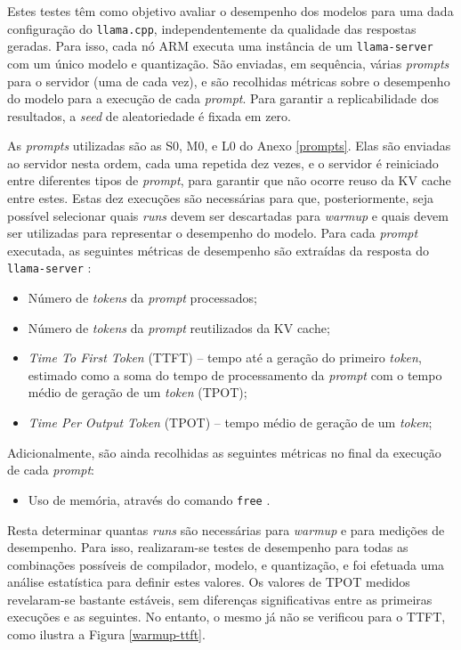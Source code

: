 \documentclass[11pt, a4paper]{article}
\begin{document}
Estes testes têm como objetivo avaliar o desempenho dos modelos para uma dada configuração do
\texttt{llama.cpp}, independentemente da qualidade das respostas geradas. Para isso, cada nó ARM
executa uma instância de um \texttt{llama-server} com um único modelo e quantização. São enviadas,
em sequência, várias \emph{prompts} para o servidor (uma de cada vez), e são recolhidas métricas
sobre o desempenho do modelo para a execução de cada \emph{prompt}. Para garantir a replicabilidade
dos resultados, a \emph{seed} de aleatoriedade é fixada em zero.

As \emph{prompts} utilizadas são as S0, M0, e L0 do Anexo \ref{prompts}. Elas são enviadas ao
servidor nesta ordem, cada uma repetida dez vezes, e o servidor é reiniciado entre diferentes tipos
de \emph{prompt}, para garantir que não ocorre reuso da KV cache entre estes. Estas dez execuções
são necessárias para que, posteriormente, seja possível selecionar quais \emph{runs} devem ser
descartadas para \emph{warmup} e quais devem ser utilizadas para representar o desempenho do modelo.
Para cada \emph{prompt} executada, as seguintes métricas de desempenho são extraídas da resposta do
\texttt{llama-server} \cite{completions-api}:

\begin{itemize}
    \item Número de \emph{tokens} da \emph{prompt} processados;
    \item Número de \emph{tokens} da \emph{prompt} reutilizados da KV cache;
    \item \emph{Time To First Token} (TTFT) -- tempo até a geração do primeiro \emph{token},
          estimado como a soma do tempo de processamento da \emph{prompt} com o tempo médio de
          geração de um \emph{token} (TPOT);
    \item \emph{Time Per Output Token} (TPOT) -- tempo médio de geração de um \emph{token};
\end{itemize}

Adicionalmente, são ainda recolhidas as seguintes métricas no final da execução de cada
\emph{prompt}:

\begin{itemize}
    \item Uso de memória, através do comando \texttt{free} \cite{free}.
\end{itemize}

Resta determinar quantas \emph{runs} são necessárias para \emph{warmup} e para medições de
desempenho. Para isso, realizaram-se testes de desempenho para todas as combinações possíveis de
compilador, modelo, e quantização, e foi efetuada uma análise estatística para definir estes
valores. Os valores de TPOT medidos revelaram-se bastante estáveis, sem diferenças significativas
entre as primeiras execuções e as seguintes. No entanto, o mesmo já não se verificou para o TTFT,
como ilustra a Figura \ref{warmup-ttft}.
\end{document}
